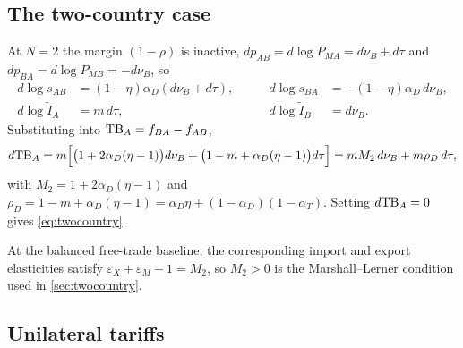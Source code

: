 \subsection{The two-country case}
\label{app:linear-twocountry}

At $N=2$ the margin $(1-\rho)$ is inactive, $dp_{AB}=d\log P_{MA}=d\nu_B+d\tau$ and $dp_{BA}=d\log P_{MB}=-d\nu_B$, so
\begin{equation*}
\begin{aligned}
d\log s_{AB}&=(1-\eta)\alpha_D(d\nu_B+d\tau),&\qquad d\log s_{BA}&=-(1-\eta)\alpha_D\,d\nu_B,\\
d\log\tilde I_A&=m\,d\tau,&\qquad d\log\tilde I_B&=d\nu_B.
\end{aligned}
\end{equation*}
Substituting into $\mathrm{TB}_A=f_{BA}-f_{AB}$,
\begin{equation*}
d\mathrm{TB}_A=m\Big[\big(1+2\alpha_D(\eta-1)\big)d\nu_B+\big(1-m+\alpha_D(\eta-1)\big)d\tau\Big]=mM_2\,d\nu_B+m\rho_D\,d\tau,
\end{equation*}
with $M_2=1+2\alpha_D(\eta-1)$ and $\rho_D=1-m+\alpha_D(\eta-1)=\alpha_D\eta+(1-\alpha_D)(1-\alpha_T)$. Setting $d\mathrm{TB}_A=0$ gives \cref{eq:twocountry}.

At the balanced free-trade baseline, the corresponding import and export elasticities satisfy $\varepsilon_X+\varepsilon_M-1=M_2$, so $M_2>0$ is the Marshall--Lerner condition used in \cref{sec:twocountry}.

\subsection{Unilateral tariffs}
\label{app:linear-unilateral}

